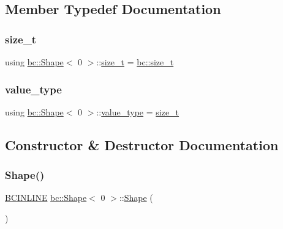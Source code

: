 \subsection{Member Typedef Documentation}
\mbox{\label{structbc_1_1Shape_3_010_01_4_a7bf4db55cfc575f40871044048ea5c03}} 
\subsubsection{\texorpdfstring{size\+\_\+t}{size\_t}}
{\footnotesize\ttfamily using \hyperlink{structbc_1_1Shape}{bc\+::\+Shape}$<$ 0 $>$\+::\hyperlink{structbc_1_1Shape_3_010_01_4_a7bf4db55cfc575f40871044048ea5c03}{size\+\_\+t} =  \hyperlink{namespacebc_aaf8e3fbf99b04b1b57c4f80c6f55d3c5}{bc\+::size\+\_\+t}}

\mbox{\label{structbc_1_1Shape_3_010_01_4_a342cb50fc2de91d730a07750321bf986}} 
\subsubsection{\texorpdfstring{value\+\_\+type}{value\_type}}
{\footnotesize\ttfamily using \hyperlink{structbc_1_1Shape}{bc\+::\+Shape}$<$ 0 $>$\+::\hyperlink{structbc_1_1Shape_3_010_01_4_a342cb50fc2de91d730a07750321bf986}{value\+\_\+type} =  \hyperlink{structbc_1_1Shape_3_010_01_4_a7bf4db55cfc575f40871044048ea5c03}{size\+\_\+t}}



\subsection{Constructor \& Destructor Documentation}
\mbox{\label{structbc_1_1Shape_3_010_01_4_ad1bb32b3c5d85cbf0baf6710511bd10c}} 
\subsubsection{\texorpdfstring{Shape()}{Shape()}\hspace{0.1cm}{\footnotesize\ttfamily [1/2]}}
{\footnotesize\ttfamily \hyperlink{common_8h_a6699e8b0449da5c0fafb878e59c1d4b1}{B\+C\+I\+N\+L\+I\+NE} \hyperlink{structbc_1_1Shape}{bc\+::\+Shape}$<$ 0 $>$\+::\hyperlink{structbc_1_1Shape}{Shape} (\begin{DoxyParamCaption}{ }\end{DoxyParamCaption})\hspace{0.3cm}{\ttfamily [inline]}}

